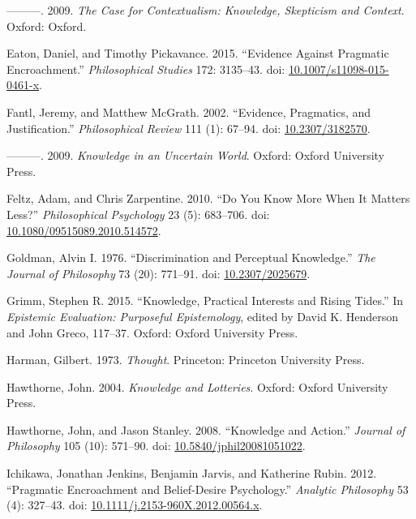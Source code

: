\documentclass[
  11pt,
  letterpaper,
  DIV=11,
  numbers=noendperiod,
  twoside]{scrartcl}
\newlength{\cslhangindent}
\newenvironment{CSLReferences}[2] %
 {\begin{list}{}{%
  \setlength{\itemindent}{0pt}
  \setlength{\leftmargin}{0pt}
  \setlength{\parsep}{0pt}
  \ifodd #1
   \setlength{\leftmargin}{\cslhangindent}
   \setlength{\itemindent}{-1\cslhangindent}
  \fi
  \setlength{\itemsep}{#2\baselineskip}}}
 {\end{list}}
\begin{document}
\begin{CSLReferences}{1}{0}
---------. 2009. \emph{The Case for Contextualism: Knowledge, Skepticism
and Context}. Oxford: Oxford.

Eaton, Daniel, and Timothy Pickavance. 2015. {``Evidence Against
Pragmatic Encroachment.''} \emph{Philosophical Studies} 172: 3135--43.
doi:
\href{https://doi.org/10.1007/s11098-015-0461-x}{10.1007/s11098-015-0461-x}.

Fantl, Jeremy, and Matthew McGrath. 2002. {``Evidence, Pragmatics, and
Justification.''} \emph{Philosophical Review} 111 (1): 67--94. doi:
\href{https://doi.org/10.2307/3182570}{10.2307/3182570}.

---------. 2009. \emph{Knowledge in an Uncertain World}. Oxford: Oxford
University Press.

Feltz, Adam, and Chris Zarpentine. 2010. {``Do You Know More When It
Matters Less?''} \emph{Philosophical Psychology} 23 (5): 683--706. doi:
\href{https://doi.org/10.1080/09515089.2010.514572}{10.1080/09515089.2010.514572}.

Goldman, Alvin I. 1976. {``Discrimination and Perceptual Knowledge.''}
\emph{The Journal of Philosophy} 73 (20): 771--91. doi:
\href{https://doi.org/10.2307/2025679}{10.2307/2025679}.

Grimm, Stephen R. 2015. {``Knowledge, Practical Interests and Rising
Tides.''} In \emph{Epistemic Evaluation: Purposeful Epistemology},
edited by David K. Henderson and John Greco, 117--37. Oxford: Oxford
University Press.

Harman, Gilbert. 1973. \emph{Thought}. Princeton: Princeton University
Press.

Hawthorne, John. 2004. \emph{Knowledge and Lotteries}. Oxford: Oxford
University Press.

Hawthorne, John, and Jason Stanley. 2008. {``{Knowledge and Action}.''}
\emph{Journal of Philosophy} 105 (10): 571--90. doi:
\href{https://doi.org/10.5840/jphil20081051022}{10.5840/jphil20081051022}.

Ichikawa, Jonathan Jenkins, Benjamin Jarvis, and Katherine Rubin. 2012.
{``Pragmatic Encroachment and Belief-Desire Psychology.''}
\emph{Analytic Philosophy} 53 (4): 327--43. doi:
\href{https://doi.org/10.1111/j.2153-960X.2012.00564.x}{10.1111/j.2153-960X.2012.00564.x}.


\end{CSLReferences}
\end{document}
